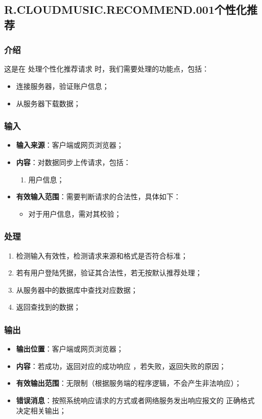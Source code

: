 \subsection{R.CLOUDMUSIC.RECOMMEND.001个性化推荐}
\subsubsection{介绍}
	这是在 处理个性化推荐请求 时，我们需要处理的功能点，包括：
	\begin{itemize}
		\item 连接服务器，验证账户信息；
		\item 从服务器下载数据；
	\end{itemize}
\subsubsection{输入}
	\begin{itemize}
		\item \textbf{输入来源}：客户端或网页浏览器；
		\item \textbf{内容}：对数据同步上传请求，包括：
		\begin{enumerate}
			\item 用户信息；
		\end{enumerate}
		\item \textbf{有效输入范围}：需要判断请求的合法性，具体如下：
		\begin{itemize}
			\item 对于用户信息，需对其校验； 
		\end{itemize}
	\end{itemize}
\subsubsection{处理}
	\begin{enumerate}
		\item 检测输入有效性，检测请求来源和格式是否符合标准；
		\item 若有用户登陆凭据，验证其合法性，若无按默认推荐处理；
		\item 从服务器中的数据库中查找对应数据；
		\item 返回查找到的数据；
	\end{enumerate}
\subsubsection{输出}
\begin{itemize}
	\item \textbf{输出位置}：客户端或网页浏览器；
	\item \textbf{内容}：若成功，返回对应的成功响应 ，若失败，返回失败的原因；
	\item \textbf{有效输出范围}：无限制（根据服务端的程序逻辑，不会产生非法响应）；
	\item \textbf{错误消息}：按照系统响应请求的方式或者网络服务发出响应报文的
		正确格式决定相关输出；
\end{itemize}

